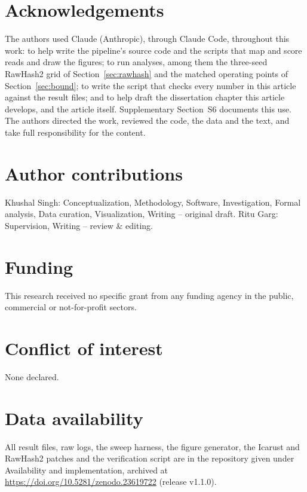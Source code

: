 \documentclass[11pt,a4paper]{article}
\newcommand{\zenodoslot}{\url{https://doi.org/10.5281/zenodo.23619722} (release v1.1.0)}
\begin{document}
\section*{Acknowledgements}
The authors used Claude (Anthropic), through Claude Code, throughout this work: to help write the
pipeline's source code and the scripts that map and score reads and draw the figures; to run
analyses, among them the three-seed RawHash2 grid of Section~\ref{sec:rawhash} and the matched
operating points of Section~\ref{sec:bound}; to write the script that checks every number in this
article against the result files; and to help draft the dissertation chapter this article
develops, and the article itself. Supplementary Section~S6 documents this use. The authors directed
the work, reviewed the code, the data and the text, and take full responsibility for the content.

\section*{Author contributions}
Khushal Singh: Conceptualization, Methodology, Software, Investigation, Formal analysis, Data
curation, Visualization, Writing -- original draft. Ritu Garg: Supervision, Writing -- review \&
editing.

\section*{Funding}
This research received no specific grant from any funding agency in the public, commercial or
not-for-profit sectors.

\section*{Conflict of interest}
None declared.

\section*{Data availability}
All result files, raw logs, the sweep harness, the figure generator, the Icarust and RawHash2
patches and the verification script are in the repository given under Availability and
implementation, archived at \zenodoslot.

\nolinenumbers


\end{document}
